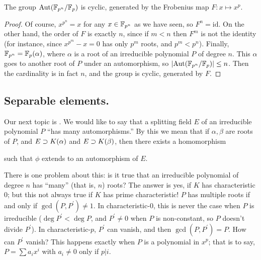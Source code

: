 \begin{cor}
The group $\mathrm{Aut}(\mathbb{F}_{p^n}/\mathbb{F}_p)$ is cyclic, generated by the Frobenius map $F: x \mapsto x^p$.
\end{cor}
\begin{proof}
Of course, $x^{p^n} = x$ for any $x \in \mathbb{F}_{p^n}$ as we have seen, so $F^n = \mathrm{id}$. 
On the other hand, the order of $F$ is exactly $n$, since if $m < n$ then $F^m$ is not the identity (for instance, since $x^{p^m} - x = 0$ has only $p^m$ roots, and $p^m < p^n$).
Finally, $\mathbb{F}_{p^n} = \mathbb{F}_p(\alpha)$, where $\alpha$ is a root of an irreducible polynomial $P$ of degree $n$.
This $\alpha$ goes to another root of $P$ under an automorphism, so $\left|\mathrm{Aut}(\mathbb{F}_{p^n} / \mathbb{F}_p)\right| \leq n$.
Then the cardinality is in fact $n$, and the group is cyclic, generated by $F$.
\end{proof}

\subsection{Separable elements.}
Our next topic is . 
We would like to say that a splitting field $E$ of an irreducible polynomial $P$ ``has many automorphisms.''
By this we mean that if $\alpha, \beta$ are roots of $P$, and $E \supset K(\alpha)$ and $E \supset K(\beta)$, then there exists a homomorphism
\begin{figure}[h]
\centering
{}
\end{figure}

such that $\phi$ extends to an automorphism of $E$.

There is one problem about this: is it true that an irreducible polynomial of degree $n$ has ``many'' (that is, $n$) roots?
The answer is yes, if $K$ has characteristic $0$; but this not always true if $K$ has prime characteristic!
$P$ has multiple roots if and only if $\gcd(P, P^\prime) \neq 1$.
In characteristic-$0$, this is never the case when $P$ is irreducible ($\deg P^\prime < \deg P$, and $P^\prime \neq 0$ when $P$ is non-constant, so $P$ doesn't divide $P^\prime$).
In characteristic-$p$, $P^\prime$ can vanish, and then $\gcd(P, P^\prime) = P$.
How can $P^\prime$ vanish?
This happens exactly when $P$ is a polynomial in $x^p$; that is to say, $P = \sum a_i x^i$ with $a_i \neq 0$ only if $p|i$.

